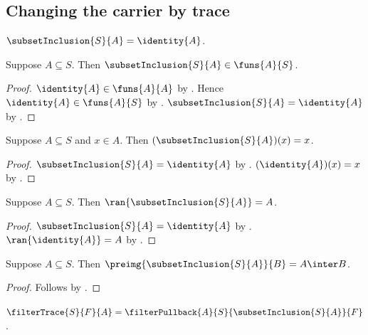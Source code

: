 \subsection{Changing the carrier by trace}

\begin{definition}\label{subset_inclusion}
    $\subsetInclusion{S}{A}=\identity{A}$.
\end{definition}

\begin{proposition}\label{subset_inclusion_type}
    Suppose $A\subseteq S$.
    Then $\subsetInclusion{S}{A}\in\funs{A}{S}$.
\end{proposition}
\begin{proof}
    $\identity{A}\in\funs{A}{A}$ by .
    Hence $\identity{A}\in\funs{A}{S}$ by .
    $\subsetInclusion{S}{A}=\identity{A}$ by .
\end{proof}

\begin{proposition}\label{subset_inclusion_apply}
    Suppose $A\subseteq S$ and $x\in A$.
    Then $(\subsetInclusion{S}{A})(x)=x$.
\end{proposition}
\begin{proof}
    $\subsetInclusion{S}{A}=\identity{A}$ by .
    $(\identity{A})(x)=x$ by .
\end{proof}

\begin{proposition}\label{subset_inclusion_range}
    Suppose $A\subseteq S$.
    Then $\ran{\subsetInclusion{S}{A}}=A$.
\end{proposition}
\begin{proof}
    $\subsetInclusion{S}{A}=\identity{A}$ by .
    $\ran{\identity{A}}=A$ by .
\end{proof}

\begin{proposition}\label{subset_inclusion_preimage}
    Suppose $A\subseteq S$.
    Then $\preimg{\subsetInclusion{S}{A}}{B}=A\inter B$.
\end{proposition}
\begin{proof}
    Follows by
        .
\end{proof}

\begin{definition}\label{filter_trace}
    $\filterTrace{S}{F}{A}
        =\filterPullback{A}{S}{\subsetInclusion{S}{A}}{F}$.
\end{definition}

